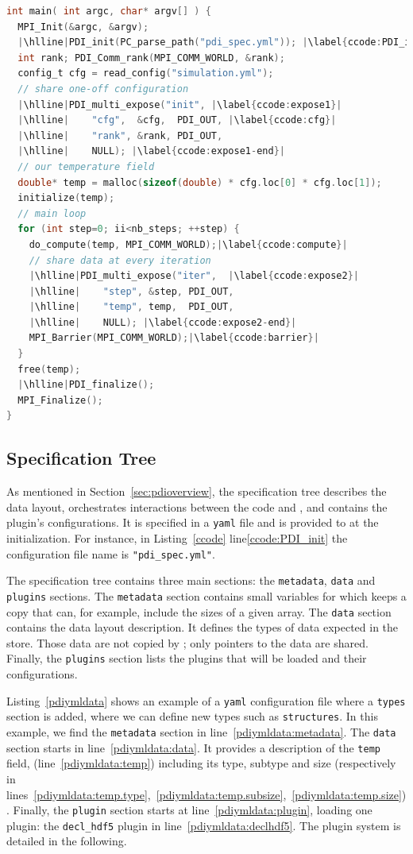 \begin{lstlisting}[float=h!, label=ccode, language=c, caption=\pdi instrumentation of the C simulation code]
int main( int argc, char* argv[] ) {
  MPI_Init(&argc, &argv);
  |\hlline|PDI_init(PC_parse_path("pdi_spec.yml")); |\label{ccode:PDI_init}|
  int rank; PDI_Comm_rank(MPI_COMM_WORLD, &rank);
  config_t cfg = read_config("simulation.yml");
  // share one-off configuration
  |\hlline|PDI_multi_expose("init", |\label{ccode:expose1}|
  |\hlline|    "cfg",  &cfg,  PDI_OUT, |\label{ccode:cfg}|
  |\hlline|    "rank", &rank, PDI_OUT,
  |\hlline|    NULL); |\label{ccode:expose1-end}|
  // our temperature field
  double* temp = malloc(sizeof(double) * cfg.loc[0] * cfg.loc[1]);
  initialize(temp);
  // main loop
  for (int step=0; ii<nb_steps; ++step) {
    do_compute(temp, MPI_COMM_WORLD);|\label{ccode:compute}|
    // share data at every iteration
    |\hlline|PDI_multi_expose("iter",  |\label{ccode:expose2}|
    |\hlline|    "step", &step, PDI_OUT,
    |\hlline|    "temp", temp,  PDI_OUT,
    |\hlline|    NULL); |\label{ccode:expose2-end}|
    MPI_Barrier(MPI_COMM_WORLD);|\label{ccode:barrier}|
  }
  free(temp);
  |\hlline|PDI_finalize();
  MPI_Finalize();
}
\end{lstlisting}

\subsection{\pdi Specification Tree}
As mentioned in Section~\ref{sec:pdioverview}, the specification tree describes the data layout, orchestrates interactions between the code and \pdi, and contains the plugin's configurations. It is specified in a \texttt{yaml} file and is provided to \pdi at the initialization. For instance, in Listing~\ref{ccode} line\ref{ccode:PDI_init} the configuration file name is \texttt{"pdi\_spec.yml"}. 

The specification tree contains three main sections: the \texttt{metadata}, \texttt{data} and \texttt{plugins} sections. The \texttt{metadata} section contains small variables for which \pdi keeps a copy that can, for example, include the sizes of a given array. The \texttt{data} section contains the data layout description. It defines the types of data expected in the store. Those data are not copied by \pdi; only pointers to the data are shared. Finally, the \texttt{plugins} section lists the plugins that will be loaded and their configurations. 

Listing~\ref{pdiymldata} shows an example of a \pdi \texttt{yaml} configuration file where a \texttt{types} section is added, where we can define new types such as \texttt{structures}. In this example, we find the \texttt{metadata} section in line~\ref{pdiymldata:metadata}. The \texttt{data} section starts in line~\ref{pdiymldata:data}. It provides a description of the \texttt{temp} field, (line~\ref{pdiymldata:temp}) including its type, subtype and size (respectively in lines~\ref{pdiymldata:temp.type},~\ref{pdiymldata:temp.subsize},~\ref{pdiymldata:temp.size}). 
Finally, the \texttt{plugin} section starts at line~\ref{pdiymldata:plugin}, loading one plugin: the \texttt{decl\_hdf5} plugin in line~\ref{pdiymldata:declhdf5}. The \pdi plugin system is detailed in the following.

